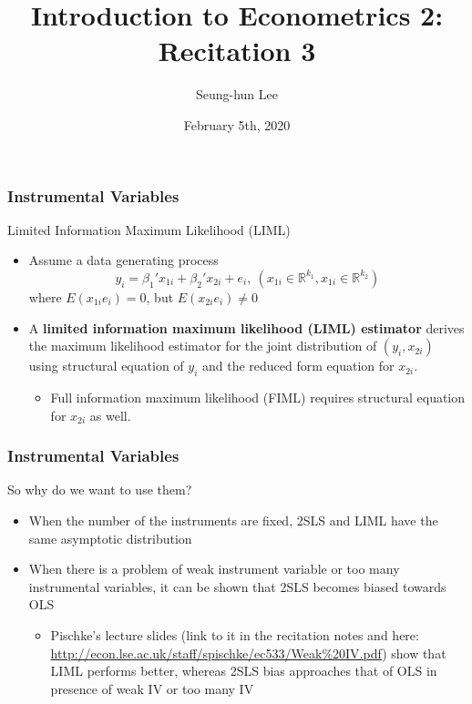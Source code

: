 \documentclass{beamer}
\title[Econometrics 2]{Introduction to Econometrics 2: Recitation 3} %
\author{Seung-hun Lee}
\institute{Columbia University}
\date{February 5th, 2020}
\begin{document}
\begin{frame}
\titlepage
\end{frame}


\begin{frame}
\frametitle{Instrumental Variables}
Limited Information Maximum Likelihood (LIML)
\begin{itemize}
\item Assume a data generating process
\[
y_ i = \beta_1' x_{1i}+ \beta_2' x_{2i}+e_i,\  (x_{1i}\in\mathbb{R}^{k_1}, x_{1i}\in\mathbb{R}^{k_2})
\]
where $E(x_{1i}e_i)=0$, but $E(x_{2i}e_i)\neq0$
\item A \textbf{limited information maximum likelihood (LIML) estimator} derives the maximum likelihood estimator for the joint distribution of $(y_i, x_{2i})$ using structural equation of $y_i$ and the reduced form equation for $x_{2i}$. 
\begin{itemize}
\item Full information maximum likelihood (FIML) requires structural equation for $x_{2i}$ as well. 
\end{itemize}
\end{itemize}
\end{frame}



\begin{frame}
\frametitle{Instrumental Variables}
So why do we want to use them?
\begin{itemize}
\item When the number of the instruments are fixed, 2SLS and LIML have the same asymptotic distribution
\item When there is a problem of weak instrument variable or too many instrumental variables, it can be shown that 2SLS becomes biased towards OLS
\begin{itemize}
\item Pischke's lecture slides (link to it in the recitation notes and here: \url{http://econ.lse.ac.uk/staff/spischke/ec533/Weak\%20IV.pdf}) show that LIML performs better, whereas 2SLS bias approaches that of OLS in presence of weak IV or too many IV
\end{itemize}
\end{itemize}
\end{frame}
\end{document}
